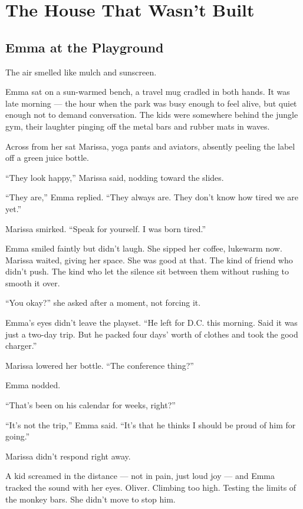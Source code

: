 \section{The House That Wasn't Built}

\subsection{Emma at the Playground}

The air smelled like mulch and sunscreen.

Emma sat on a sun-warmed bench, a travel mug cradled in both hands. It was late morning — the hour 
when the park was busy enough to feel alive, but quiet enough not to demand conversation. The kids 
were somewhere behind the jungle gym, their laughter pinging off the metal bars and rubber mats in 
waves.

Across from her sat Marissa, yoga pants and aviators, absently peeling the label off a green juice bottle.

``They look happy,'' Marissa said, nodding toward the slides.

``They are,'' Emma replied. ``They always are. They don’t know how tired we are yet.''

Marissa smirked. ``Speak for yourself. I was born tired.''

Emma smiled faintly but didn’t laugh. She sipped her coffee, lukewarm now. Marissa waited, giving her 
space. She was good at that. The kind of friend who didn’t push. The kind who let the silence sit between 
them without rushing to smooth it over.

``You okay?'' she asked after a moment, not forcing it.

Emma’s eyes didn’t leave the playset. ``He left for D.C. this morning. Said it was just a two-day trip. 
But he packed four days’ worth of clothes and took the good charger.''

Marissa lowered her bottle. ``The conference thing?''

Emma nodded.

``That’s been on his calendar for weeks, right?''

``It’s not the trip,'' Emma said. ``It’s that he thinks I should be proud of him for going.''

Marissa didn’t respond right away.

A kid screamed in the distance --- not in pain, just loud joy --- and Emma tracked the sound with her eyes. 
Oliver. Climbing too high. Testing the limits of the monkey bars. She didn't move to stop him.

